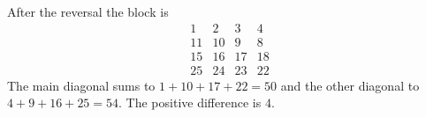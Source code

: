 After the reversal the block is
\[
\begin{array}{cccc}
1&2&3&4\\
11&10&9&8\\
15&16&17&18\\
25&24&23&22
\end{array}
\]
The main diagonal sums to $1+10+17+22=50$ and the other diagonal to $4+9+16+25=54$. The positive difference is $\boxed{4}$.
